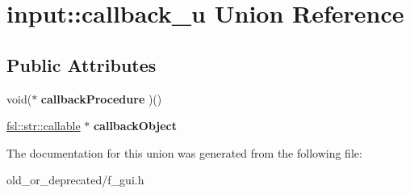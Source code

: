 \hypertarget{unioninput_1_1callback__u}{}\section{input\+::callback\+\_\+u Union Reference}
\label{unioninput_1_1callback__u}
\subsection*{Public Attributes}
\begin{DoxyCompactItemize}
\item 
\mbox{\label{unioninput_1_1callback__u_aa39da4199c12c0b0d75a961127caedb4}} 
void($\ast$ {\bfseries callback\+Procedure} )()
\item 
\mbox{\label{unioninput_1_1callback__u_ac5a3d1e8b1f7ea2f962f5651f65fcd48}} 
\mbox{\hyperlink{classfsl_1_1str_1_1callable}{fsl\+::str\+::callable}} $\ast$ {\bfseries callback\+Object}
\end{DoxyCompactItemize}


The documentation for this union was generated from the following file\+:\begin{DoxyCompactItemize}
\item 
old\+\_\+or\+\_\+deprecated/f\+\_\+gui.\+h\end{DoxyCompactItemize}

